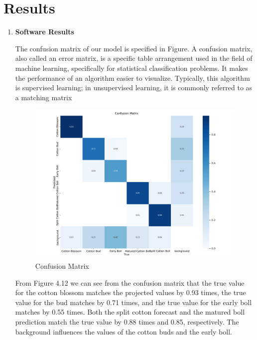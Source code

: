 \documentclass[12pt,a4paper]{report}
\begin{document}
\section {Results}
\begin{enumerate}
\item {\bf{Software Results}}

\par The confusion matrix of our model is specified in Figure. A confusion matrix, also called an error matrix, is a specific table arrangement used in the field of machine learning, specifically for statistical classification problems. It makes the performance of an algorithm easier to visualize. Typically, this algorithm is supervised learning; in unsupervised learning, it is commonly referred to as a matching matrix

\begin{figure}[!htb]
\begin{center}
\includegraphics[scale=0.5]{images/results/confusion_matrix.png}
\caption{Confusion Matrix}
\end{center}
\end{figure}

\par From Figure 4.12 we can see from the confusion matrix that the true value for the cotton blossom matches the projected values by 0.93 times, the true value for the bud matches by 0.71 times, and the true value for the early boll matches by 0.55 times. Both the split cotton forecast and the matured boll prediction match the true value by 0.88 times and 0.85, respectively. The background influences the values of the cotton buds and the early boll.


\end{enumerate}
\end{document}
